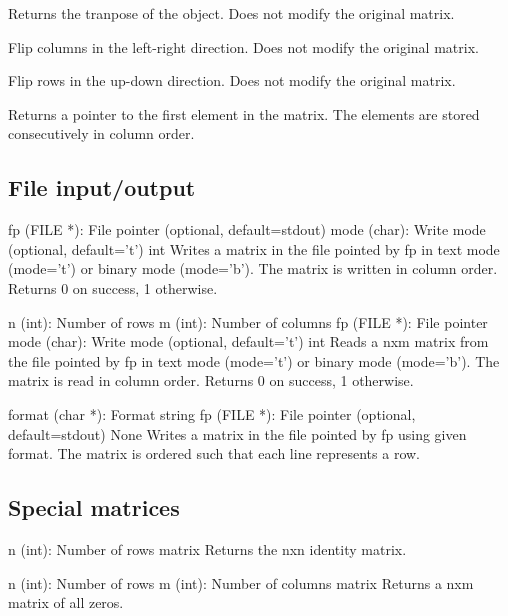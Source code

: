 {Returns the tranpose of the object. Does not modify the original matrix.}

{Flip columns in the left-right direction. Does not modify the original matrix.}

{Flip rows in the up-down direction. Does not modify the original matrix.}

{Returns a pointer to the first element in the matrix. The elements are stored consecutively in column order.}

\subsection{File input/output}

{fp (FILE *): File pointer (optional, default=stdout)\newline
mode (char): Write mode (optional, default='t')}
{int}
{Writes a matrix in the file pointed by fp in text mode (mode='t') or binary mode (mode='b').
The matrix is written in column order. Returns 0 on success, 1 otherwise.}

{n (int): Number of rows\newline
m (int): Number of columns\newline
fp (FILE *): File pointer\newline
mode (char): Write mode (optional, default='t')}
{int}
{Reads a nxm matrix from the file pointed by fp in text mode (mode='t') or binary mode (mode='b').
The matrix is read in column order. Returns 0 on success, 1 otherwise.}

{format (char *): Format string
fp (FILE *): File pointer (optional, default=stdout)}
{None}
{Writes a matrix in the file pointed by fp using given format. The matrix is ordered such that
each line represents a row.}

\funcrefpagebreak
{}
\subsection{Special matrices}

{n (int): Number of rows}
{matrix}
{Returns the nxn identity matrix.}

{n (int): Number of rows\newline
m (int): Number of columns}
{matrix}
{Returns a nxm matrix of all zeros.}

